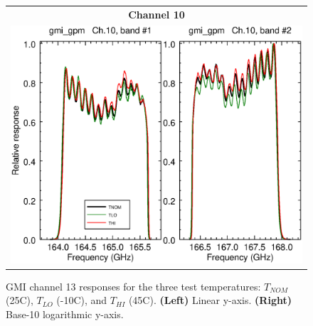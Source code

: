 \begin{figure}[H]
  \centering
  \begin{tabular}{c c}
    \multicolumn{2}{c}{\sffamily\textbf{Channel 10}}\\
    \multicolumn{2}{c}{\includegraphics[scale=0.35]{graphics/lin/gmi_gpm-10.eps}}
  \end{tabular}
  \caption{GMI channel 13 responses for the three test temperatures: $T_{NOM}$ (25\textdegree{}C), $T_{LO}$ (-10\textdegree{}C), and $T_{HI}$ (45\textdegree{}C). \textbf{(Left)} Linear y-axis. \textbf{(Right)} Base-10 logarithmic y-axis.}
  \label{fig:ch10-13_response}
\end{figure}
